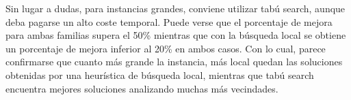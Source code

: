 Sin lugar a dudas, para instancias grandes, conviene utilizar tabú search, aunque deba pagarse un alto coste temporal. Puede verse que el porcentaje de mejora para ambas familias supera el 50\% mientras que con la búsqueda local se obtiene un porcentaje de mejora inferior al 20\% en ambos casos. Con lo cual, parece confirmarse que cuanto más grande la instancia, más local quedan las soluciones obtenidas por una heurística de búsqueda local, mientras que tabú search encuentra mejores soluciones analizando muchas más vecindades.

